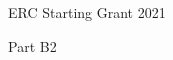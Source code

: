 \documentclass[a4paper,11pt]{article}
\newcommand\BackImage[2][scale=1]{%
\BgThispage
\backgroundsetup{
  contents={\texttt{[image: \#2]}}
  }
}
\begin{document}

\renewcommand{\headrulewidth}{0pt}

\pagestyle{fancyplain}


\centerline{\huge ERC Starting Grant 2021}
\centerline{\huge Part B2}

\vspace{0.5cm}
%
%
  





\end{document}
